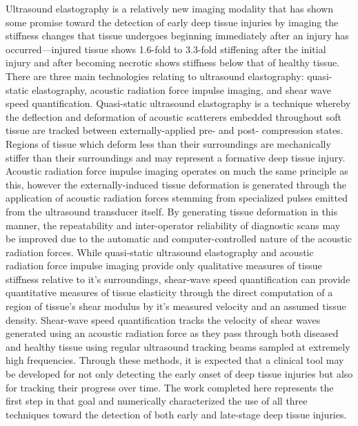 	Ultrasound elastography is a relatively new imaging modality that has shown some promise toward the detection of early deep tissue injuries by imaging the stiffness changes that tissue undergoes beginning immediately after an injury has occurred---injured tissue shows 1.6-fold to 3.3-fold stiffening after the initial injury and after becoming necrotic shows stiffness below that of healthy tissue. There are three main technologies relating to ultrasound elastography: quasi-static elastography, acoustic radiation force impulse imaging, and shear wave speed quantification. Quasi-static ultrasound elastography is a technique whereby the deflection and deformation of acoustic scatterers embedded throughout soft tissue are tracked between externally-applied pre- and post- compression states. Regions of tissue which deform less than their surroundings are mechanically stiffer than their surroundings and may represent a formative deep tissue injury. Acoustic radiation force impulse imaging operates on much the same principle as this, however the externally-induced tissue deformation is generated through the application of acoustic radiation forces stemming from specialized pulses emitted from the ultrasound transducer itself. By generating tissue deformation in this manner, the repeatability and inter-operator reliability of diagnostic scans may be improved due to the automatic and computer-controlled nature of the acoustic radiation forces. While quasi-static ultrasound elastography and acoustic radiation force impulse imaging provide only qualitative measures of tissue stiffness relative to it's surroundings, shear-wave speed quantification can provide quantitative measures of tissue elasticity through the direct computation of a region of tissue's shear modulus by it's measured velocity and an assumed tissue density. Shear-wave speed quantification tracks the velocity of shear waves generated using an acoustic radiation force as they pass through both diseased and healthy tissue using regular ultrasound tracking beams sampled at extremely high frequencies. Through these methods, it is expected that a clinical tool may be developed for not only detecting the early onset of deep tissue injuries but also for tracking their progress over time. The work completed here represents the first step in that goal and numerically characterized the use of all three techniques toward the detection of both early and late-stage deep tissue injuries.

